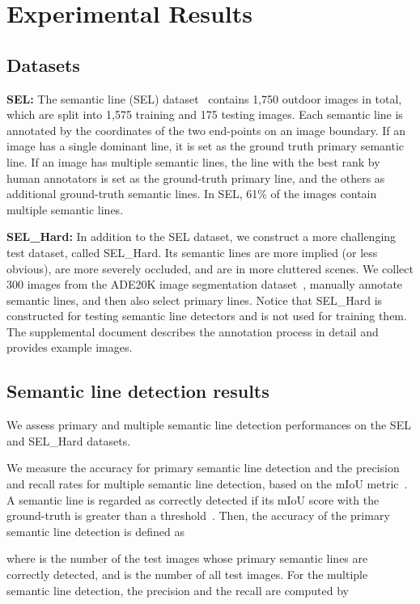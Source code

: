 \documentclass[runningheads]{llncs}
\begin{document}
\section{Experimental Results}

\subsection{Datasets}

\noindent\textbf{SEL:}
The semantic line (SEL) dataset~\cite{lee2017} contains 1,750 outdoor images in total, which are split into 1,575 training and 175 testing images. Each semantic line is annotated by the coordinates of the two end-points on an image boundary. If an image has a single dominant line, it is set as the ground truth primary semantic line. If an image has multiple semantic lines, the line with the best rank by human annotators is set as the ground-truth primary line, and the others as additional ground-truth semantic lines. In SEL, 61\% of the images contain multiple semantic lines.





\noindent\textbf{SEL\_Hard:}
In addition to the SEL dataset, we construct a more challenging test dataset, called SEL\_Hard. Its semantic lines are more implied (or less obvious), are more severely occluded, and are in more cluttered scenes. We collect 300 images from the ADE20K image segmentation dataset~\cite{zhou2017_ade}, manually annotate semantic lines, and then also select primary lines. Notice that SEL\_Hard is constructed for testing semantic line detectors and is not used for training them. The supplemental document describes the annotation process in detail and provides example images.


\subsection{Semantic line detection results}
We assess primary and multiple semantic line detection performances on the SEL and SEL\_Hard datasets.

We measure the accuracy for primary semantic line detection and the precision and recall rates for multiple semantic line detection, based on the mIoU metric~\cite{lee2017}. A semantic line is regarded as correctly detected if its mIoU score with the ground-truth is greater than a threshold~. Then, the accuracy of the primary semantic line detection is defined as

where  is the number of the test images whose primary semantic lines are correctly detected, and  is the number of all test images. For the multiple semantic line detection, the precision and the recall are computed by
\end{document}
